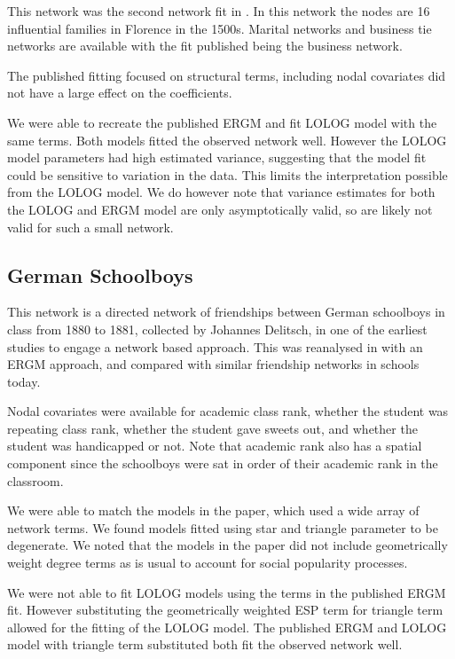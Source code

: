 \documentclass[
]{statsoc}
\begin{document}
This network was the second network fit in \cite{Robins2007}. In this
network the nodes are 16 influential families in Florence in the 1500s.
Marital networks and business tie networks are available with the fit
published being the business network.

The published fitting focused on structural terms, including nodal
covariates did not have a large effect on the coefficients.

We were able to recreate the published ERGM and fit LOLOG model with the
same terms. Both models fitted the observed network well. However the
LOLOG model parameters had high estimated variance, suggesting that the
model fit could be sensitive to variation in the data. This limits the
interpretation possible from the LOLOG model. We do however note that
variance estimates for both the LOLOG and ERGM model are only
asymptotically valid, so are likely not valid for such a small network.

\subsection{German Schoolboys}

This network is a directed network of friendships between German
schoolboys in class from 1880 to 1881, collected by Johannes Delitsch,
in one of the earliest studies to engage a network based approach. This
was reanalysed in \cite{Heidler2014} with an ERGM approach, and compared
with similar friendship networks in schools today.

Nodal covariates were available for academic class rank, whether the
student was repeating class rank, whether the student gave sweets out,
and whether the student was handicapped or not. Note that academic rank
also has a spatial component since the schoolboys were sat in order of
their academic rank in the classroom.

We were able to match the models in the paper, which used a wide array
of network terms. We found models fitted using star and triangle
parameter to be degenerate. We noted that the models in the paper did
not include geometrically weight degree terms as is usual to account for
social popularity processes.

We were not able to fit LOLOG models using the terms in the published
ERGM fit. However substituting the geometrically weighted ESP term for
triangle term allowed for the fitting of the LOLOG model. The published
ERGM and LOLOG model with triangle term substituted both fit the
observed network well.
\end{document}
